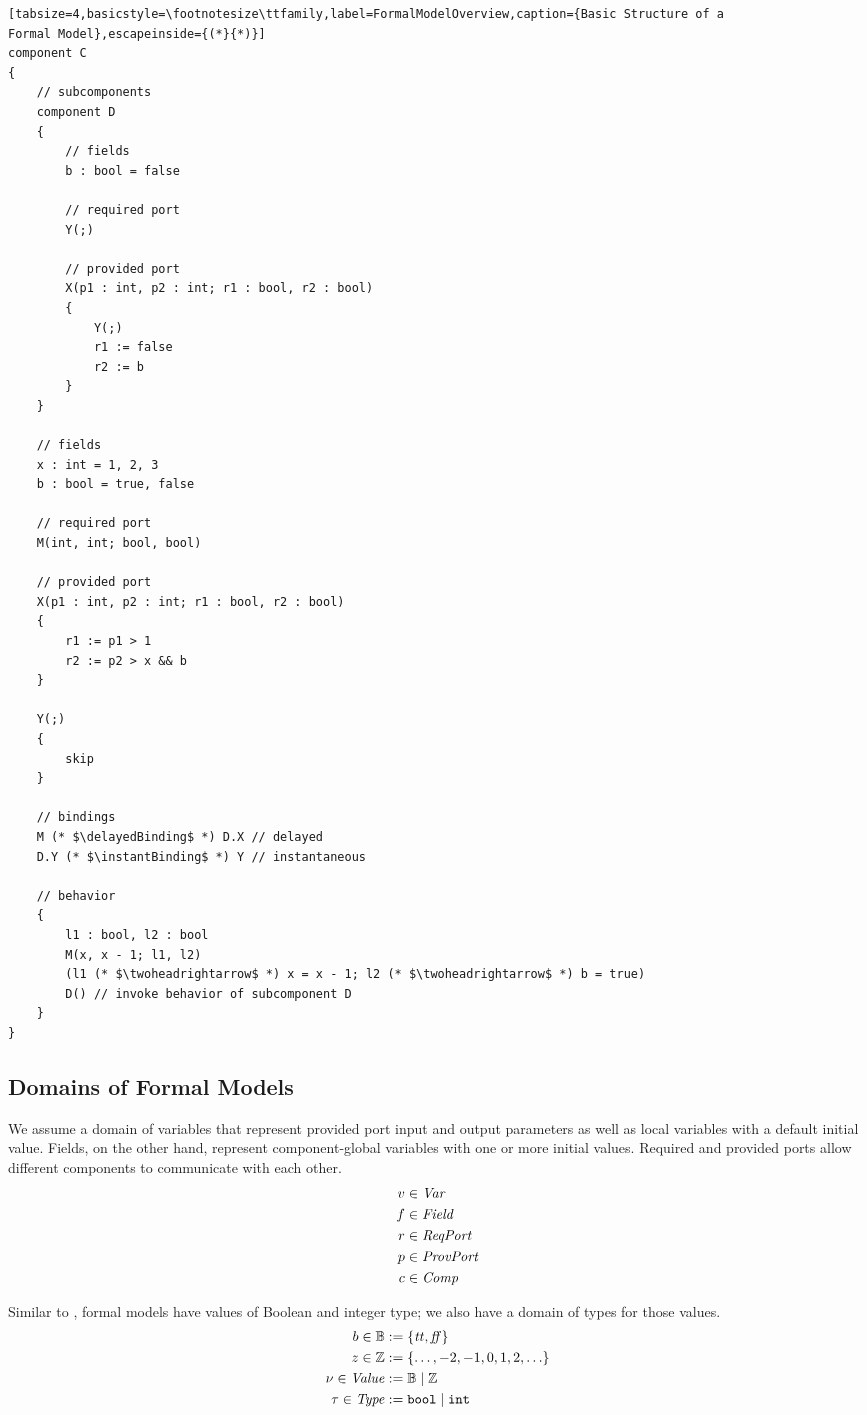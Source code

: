 \documentclass[a4paper,10pt,english]{article}
\begin{document}
\begin{lstlisting}[tabsize=4,basicstyle=\footnotesize\ttfamily,label=FormalModelOverview,caption={Basic Structure of a
Formal Model},escapeinside={(*}{*)}]
component C
{
	// subcomponents
	component D
	{
		// fields
		b : bool = false
			 		
		// required port
		Y(;)
		
		// provided port
		X(p1 : int, p2 : int; r1 : bool, r2 : bool)
		{
			Y(;)
			r1 := false
			r2 := b
		}
	}

	// fields
	x : int = 1, 2, 3
	b : bool = true, false
		
	// required port
	M(int, int; bool, bool)
		
	// provided port
	X(p1 : int, p2 : int; r1 : bool, r2 : bool)
	{
		r1 := p1 > 1
		r2 := p2 > x && b
	}	
	
	Y(;)
	{
		skip
	}
		
	// bindings
	M (* $\delayedBinding$ *) D.X // delayed
	D.Y (* $\instantBinding$ *) Y // instantaneous
	
	// behavior
	{
		l1 : bool, l2 : bool
		M(x, x - 1; l1, l2)
		(l1 (* $\twoheadrightarrow$ *) x = x - 1; l2 (* $\twoheadrightarrow$ *) b = true)
		D() // invoke behavior of subcomponent D
	}
}
\end{lstlisting}

\subsection{Domains of Formal Models}
We assume a domain of variables that represent provided port input and output parameters as well as local variables with a default
initial value. Fields, on the other hand, represent component-global variables with one or more initial values. Required and
provided ports allow different components to communicate with each other.
\begin{align*}
	v &\in \mathit{Var} \\
	f &\in \mathit{Field} \\
	r &\in \mathit{ReqPort} \\
	p &\in \mathit{ProvPort} \\
	c&\in \mathit{Comp}
\end{align*}

Similar to \Fil, formal models have values of Boolean and integer type; we also have a domain of types
for those values.
\begin{align*}
    b \in \mathbb{B} &:= \{ \mathit{tt}, \mathit{ff} \}
    \\
    z \in \mathbb{Z} &:= \{ \ldots, -2, -1, 0, 1, 2, \ldots \}
    \\
    \nu \in \mathit{Value} &:= \mathbb{B} \mid \mathbb{Z}
    \\
	\tau \in \mathit{Type} &:= \mathtt{bool} \mid \mathtt{int}
\end{align*}
\end{document}
